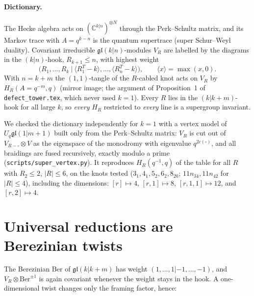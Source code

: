 \documentclass[11pt]{article}
\theoremstyle{remark}
\begin{document}
\paragraph{Dictionary.} The Hecke algebra acts on $(\mathbb{C}^{k|n})^{\otimes N}$ through the Perk--Schultz
matrix, and its Markov trace with $A=q^{k-n}$ is the quantum supertrace (super Schur--Weyl duality).  Covariant
irreducible $\mathfrak{gl}(k|n)$-modules $V_R$ are labelled by the diagrams in the $(k|n)$-hook,
$R_{k+1}\le n$, with highest weight
\begin{equation}\label{hw}
  \big(R_1,\dots,R_k\ \big|\ \langle R^T_1-k\rangle,\dots,\langle R^T_n-k\rangle\big),\qquad \langle x\rangle=\max(x,0).
\end{equation}
With $n=k+m$ the $(1,1)$-tangle of the $R$-cabled knot acts on $V_R$ by $H_R(A=q^{-m},q)$ (mirror image;
the argument of Proposition~1 of \texttt{defect\_tower.tex}, which never used $k=1$).  Every $R$ lies in the
$(k|k+m)$-hook for all large $k$, so \emph{every} $H_R$ restricted to \emph{every} line is a supergroup invariant.

We checked the dictionary independently for $k=1$ with a vertex model of $U_q\mathfrak{gl}(1|m+1)$ built only from
the Perk--Schultz matrix: $V_R$ is cut out of $V_{R-\square}\otimes V$ as the eigenspace of the monodromy with
eigenvalue $q^{2c(\square)}$, and all braidings are fused recursively, exactly modulo a prime
(\texttt{scripts/super\_vertex.py}).  It reproduces $H_R(q^{-1},q)$ of the table for all $R$ with
$R_2\le2$, $|R|\le6$, on the knots tested ($3_1,4_1,5_2,6_2,8_{20}$; $11n_{34},11n_{42}$ for $|R|\le4$),
including the dimensions: $[r]\mapsto4$, $[r,1]\mapsto8$, $[r,1,1]\mapsto12$, and $[r,2]\mapsto4$.

\section{Universal reductions are Berezinian twists}

The Berezinian $\mathrm{Ber}$ of $\mathfrak{gl}(k|k+m)$ has weight $(1,\dots,1|-1,\dots,-1)$, and
$V_R\otimes\mathrm{Ber}^{\pm1}$ is again covariant whenever the weight stays in the hook.  A one-dimensional twist
changes only the framing factor, hence:
\end{document}
